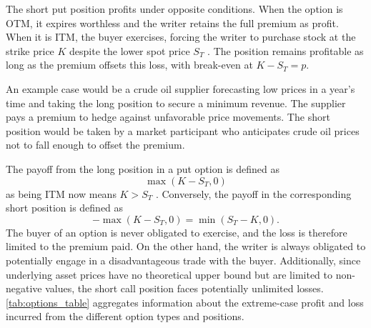\documentclass[english,12pt,a4paper,pdftex,sci,utf8]{aaltothesis}
\begin{document}
The short put position profits under opposite conditions. When the option is OTM, it expires worthless and the writer retains the full premium as profit. When it is ITM, the buyer exercises, forcing the writer to purchase stock at the strike price $K$ despite the lower spot price $S_T$ \cite{hull2018}. The position remains profitable as long as the premium offsets this loss, with break-even at $K - S_T = p$.

An example case would be a crude oil supplier forecasting low prices in a year's time and taking the long position to secure a minimum revenue. The supplier pays a premium to hedge against unfavorable price movements. The short position would be taken by a market participant who anticipates crude oil prices not to fall enough to offset the premium.

The payoff from the long position in a put option is defined as
\begin{equation}
    \max(K-S_T,0)
\label{eq:long_put_payoff}
\end{equation}
as being ITM now means $K > S_T$ \cite{hull2018}. Conversely, the payoff in the corresponding short position is defined as
\begin{equation*}
    -\max(K-S_T,0) = \min(S_T-K,0).
\end{equation*}
The buyer of an option is never obligated to exercise, and the loss is therefore limited to the premium paid. On the other hand, the writer is always obligated to potentially engage in a disadvantageous trade with the buyer. Additionally, since underlying asset prices have no theoretical upper bound but are limited to non-negative values, the short call position faces potentially unlimited losses. \cref{tab:options_table} aggregates information about the extreme-case profit and loss incurred from the different option types and positions.
\end{document}
